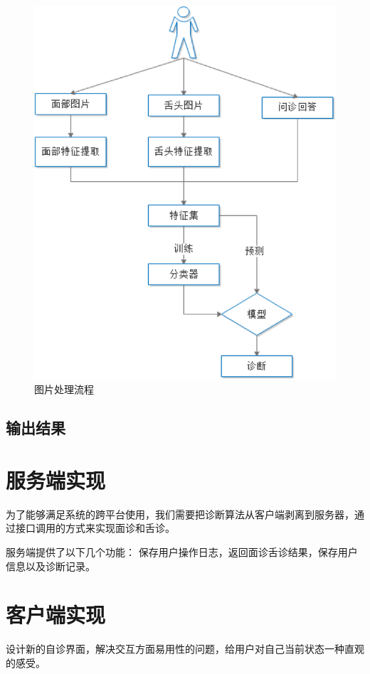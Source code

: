 \begin{figure}
    \centering
    \includegraphics{images/1.png}
    \caption{图片处理流程}
    \label{fig:f1}
\end{figure}

\subsection{输出结果}



\section{服务端实现}
为了能够满足系统的跨平台使用，我们需要把诊断算法从客户端剥离到服务器，通过接口调用的方式来实现面诊和舌诊。

服务端提供了以下几个功能：
保存用户操作日志，返回面诊舌诊结果，保存用户信息以及诊断记录。



\section{客户端实现}
设计新的自诊界面，解决交互方面易用性的问题，给用户对自己当前状态一种直观的感受。
 
